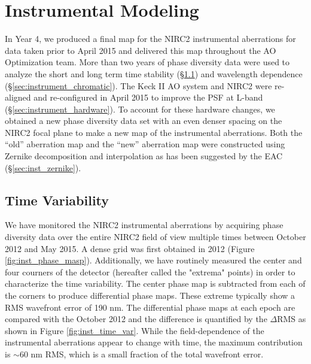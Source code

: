 \section{Instrumental Modeling}
\label{sec:instrument}

In Year 4, we produced a final map for the NIRC2 instrumental
aberrations for data taken prior to April 2015 and delivered this map
throughout the AO Optimization team. More than two years of
phase diversity data were used to analyze the short and long term time
stability (\S\ref{sec:instrument_time}) and wavelength dependence 
(\S\ref{sec:instrument_chromatic}). 
The Keck \textrm{II} AO system and NIRC2 were re-aligned and
re-configured in April 2015 to improve the PSF at L-band
(\S\ref{sec:instrument_hardware}). To account for these hardware changes, we 
obtained a new phase diversity data set with an even denser spacing on
the NIRC2 focal plane to make a new map of the instrumental
aberrations.
Both the ``old'' aberration map and the ``new'' aberration map were
constructed using Zernike decomposition and interpolation as has been
suggested by the EAC (\S\ref{sec:inst_zernike}).

\subsection{Time Variability}
\label{sec:instrument_time}

We have monitored the NIRC2 instrumental aberrations by 
acquiring phase diversity data over the entire NIRC2 field of view
multiple times between October 2012 and May 2015. 
A dense grid was first obtained in 2012 (Figure \ref{fig:inst_phase_masp}). 
Additionally, we have routinely measured the center and four courners
of the detector
(hereafter called the "extrema" points) in order to characterize the
time variability. The center phase map is subtracted from each of the
corners to produce differential phase maps. These extreme typically
show a RMS wavefront error of 190 nm. The differential phase
maps at each epoch are compared with the October 2012 and the
difference is quantified by the $\Delta$RMS as shown in Figure
\ref{fig:inst_time_var}. 
While the field-dependence of the instrumental aberrations appear to
change with time, the maximum contribution is $\sim$60 nm RMS, which
is a small fraction of the total wavefront error. 
    
    
    
  
  
  
  
  
  